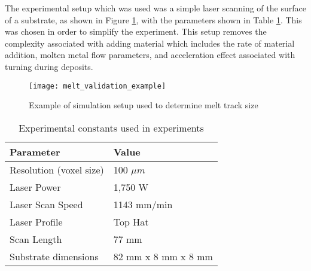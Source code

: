The experimental setup which was used was a simple laser scanning of the surface of a substrate, as shown in Figure \ref{fig:melt_validation_example}, with the parameters shown in Table \ref{tab:exp_constants}.  This was chosen in order to simplify the experiment.  This setup removes the complexity associated with adding material which includes the rate of material addition, molten metal flow parameters, and acceleration effect associated with turning during deposits.
\begin{figure}[!htb]
	\centering
	\texttt{[image: melt\_validation\_example]}
	\caption{Example of simulation setup used to determine melt track size}
	\label{fig:melt_validation_example}
\end{figure}
\begin{table}[!htb]
	\centering
	\caption{Experimental constants used in  experiments}
	\label{tab:exp_constants}
	\begin{tabular}{|l|l|} \hline
		Parameter & Value \\ \hline
		Resolution (voxel size) & 100 $\mu m$ \\ \hline
		Laser Power & 1,750 W \\ \hline
		Laser Scan Speed & 1143 mm/min \\ \hline
		Laser Profile & Top Hat \\ \hline
		Scan Length & 77 mm \\ \hline
		Substrate dimensions & 82 mm x 8 mm x 8 mm \\ \hline
	\end{tabular}
\end{table}


